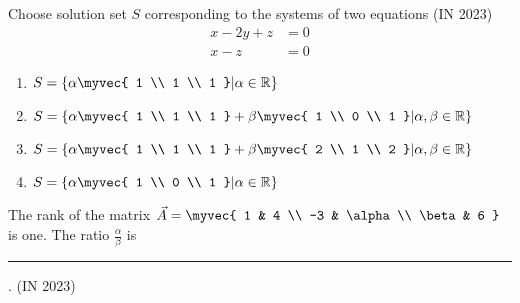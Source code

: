     \item Choose solution set $S$ corresponding to the systems of two equations
    \hfill(IN 2023)
    \begin{align*}
    x - 2y + z &= 0 \\
    x - z &= 0
    \end{align*}
    \begin{multicols}{2}
    \begin{enumerate}
        \item $S = \left\{ \alpha \myvec{ 1 \\ 1 \\ 1 } \middle| \alpha \in \mathbb{R} \right\}$
        \item $S = \left\{ \alpha \myvec{ 1 \\ 1 \\ 1 } + \beta \myvec{ 1 \\ 0 \\ 1 } \middle| \alpha, \beta \in \mathbb{R} \right\}$
        \item $S = \left\{ \alpha \myvec{ 1 \\ 1 \\ 1 } + \beta \myvec{ 2 \\ 1 \\ 2 } \middle| \alpha, \beta \in \mathbb{R} \right\}$
        \item $S = \left\{ \alpha \myvec{ 1 \\ 0 \\ 1 } \middle| \alpha \in \mathbb{R} \right\}$
    \end{enumerate}
\end{multicols}
    \item The rank of the matrix $\Vec{A} = \myvec{ 1 & 4 \\ -3 & \alpha \\ \beta & 6 }$ is one. The ratio $\frac{\alpha}{\beta}$ is \rule{1cm}{0.01pt}.
\hfill(IN 2023)
